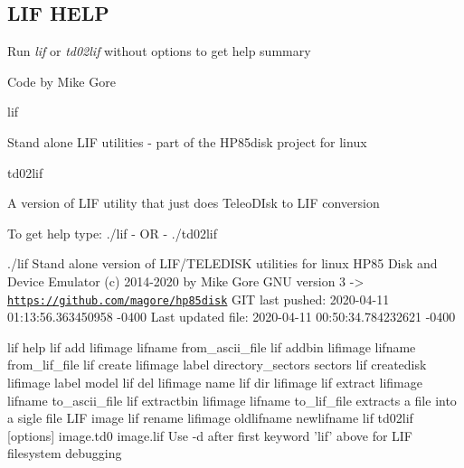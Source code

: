 \subsection*{L\+IF H\+E\+LP}

Run {\itshape lif} or {\itshape td02lif} without options to get help summary
\begin{DoxyItemize}
\item Code by Mike Gore
\begin{DoxyItemize}
\item lif
\begin{DoxyItemize}
\item Stand alone L\+IF utilities -\/ part of the H\+P85disk project for linux
\end{DoxyItemize}
\item td02lif
\begin{DoxyItemize}
\item A version of L\+IF utility that just does Teleo\+D\+Isk to L\+IF conversion
\end{DoxyItemize}
\end{DoxyItemize}

To get help type\+: ./lif -\/ OR -\/ ./td02lif
\end{DoxyItemize}


\begin{DoxyPre}
    ./lif
    Stand alone version of LIF/TELEDISK utilities for linux
    HP85 Disk and Device Emulator
     (c) 2014-2020 by Mike Gore
     GNU version 3
    -> \href{https://github.com/magore/hp85disk}{\tt https://github.com/magore/hp85disk}
       GIT last pushed:   2020-04-11 01:13:56.363450958 -0400
       Last updated file: 2020-04-11 00:50:34.784232621 -0400\end{DoxyPre}



\begin{DoxyPre}    lif help
    lif add lifimage lifname from\_ascii\_file
    lif addbin lifimage lifname from\_lif\_file
    lif create lifimage label directory\_sectors sectors
    lif createdisk lifimage label model
    lif del lifimage name
    lif dir lifimage
    lif extract lifimage lifname to\_ascii\_file
    lif extractbin lifimage lifname to\_lif\_file
        extracts a file into a sigle file LIF image
    lif rename lifimage oldlifname newlifname
    lif td02lif [options] image.td0 image.lif
    Use -d after first keyword 'lif' above for LIF filesystem debugging\end{DoxyPre}



